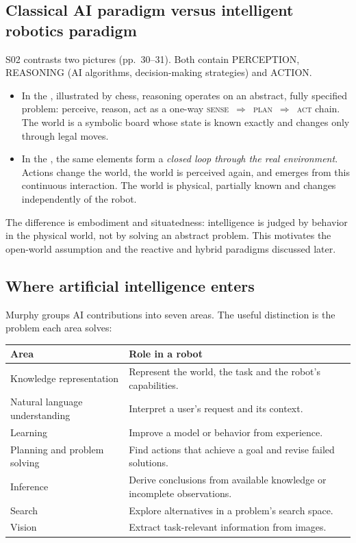 \subsection{Classical AI paradigm versus intelligent robotics paradigm}
S02 contrasts two pictures (pp.~30--31). Both contain PERCEPTION, REASONING (AI algorithms, decision-making strategies) and ACTION.
\begin{itemize}
\item In the , illustrated by chess, reasoning operates on an abstract, fully specified problem: perceive, reason, act as a one-way \textsc{sense}~$\Rightarrow$~\textsc{plan}~$\Rightarrow$~\textsc{act} chain. The world is a symbolic board whose state is known exactly and changes only through legal moves.
\item In the , the same elements form a \emph{closed loop through the real environment}. Actions change the world, the world is perceived again, and  emerges from this continuous interaction. The world is physical, partially known and changes independently of the robot.
\end{itemize}
The difference is embodiment and situatedness: intelligence is judged by behavior in the physical world, not by solving an abstract problem. This motivates the open-world assumption and the reactive and hybrid paradigms discussed later.

\begin{samepage}\subsection{Where artificial intelligence enters}
Murphy groups AI contributions into seven areas. The useful distinction is the problem each area solves:
\par\smallskip\begin{tabularx}{\linewidth}{@{}L{43mm}Y@{}}
\toprule
Area & Role in a robot \\
\midrule
Knowledge representation & Represent the world, the task and the robot's capabilities. \\
Natural language understanding & Interpret a user's request and its context. \\
Learning & Improve a model or behavior from experience. \\
Planning and problem solving & Find actions that achieve a goal and revise failed solutions. \\
Inference & Derive conclusions from available knowledge or incomplete observations. \\
Search & Explore alternatives in a problem's search space. \\
Vision & Extract task-relevant information from images. \\
\bottomrule
\end{tabularx}\par\smallskip\end{samepage}

